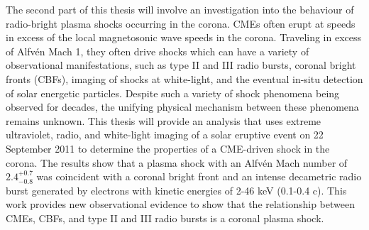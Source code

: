 \begin{abstracts}
The second part of this thesis will involve an investigation into the behaviour of radio-bright plasma shocks occurring in the corona. CMEs often erupt at speeds in excess of the local magnetosonic wave speeds in the corona. Traveling in excess of Alfv\'{e}n Mach 1, they often drive shocks which can have a variety of observational manifestations, such as type II and III radio bursts, coronal bright fronts (CBFs), imaging of shocks at white-light, and the eventual in-situ detection of solar energetic particles. Despite such a variety of shock phenomena being observed for decades, the unifying physical mechanism between these phenomena remains unknown. This thesis will provide an analysis that uses extreme ultraviolet, radio, and white-light imaging of a solar eruptive event on 22 September 2011 to determine the properties of a CME-driven shock in the corona. The results show that a plasma shock with an Alfv\'{e}n Mach number of $2.4^{+0.7}_{-0.8}$ was coincident with a coronal bright front and an intense decametric radio burst generated by electrons with kinetic energies of 2-46 keV (0.1-0.4 c). This work provides new observational evidence to show that the relationship between CMEs, CBFs, and type II and III radio bursts is a coronal plasma shock. 



\end{abstracts}

